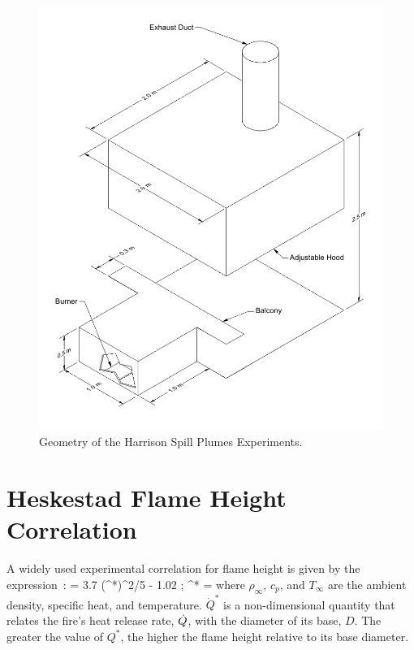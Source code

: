 \begin{figure}[p]
\includegraphics[width=\textwidth]{FIGURES/Harrison_Spill_Plumes/Harrison_Spill_Plumes}
\caption{Geometry of the Harrison Spill Plumes Experiments.}
\label{Harrison_Drawing}
\end{figure}




\section{Heskestad Flame Height Correlation}
\label{Heskestad_Flame_Height_Description}

A widely used experimental correlation for flame height is given by the expression~\cite{Heskestad:FSJ1983,SFPE:Heskestad}:
\be
    = 3.7 \; (^*)^{2/5} - 1.02  \quad ; \quad {}^* = 
\ee
where $\rho_\infty$, $c_p$, and $T_\infty$ are the ambient density, specific heat, and temperature. $\dot{Q}^*$ is a non-dimensional quantity that relates the fire's heat release rate, $\dot{Q}$, with the diameter of its base, $D$. The greater the value of $Q^*$, the higher the flame height relative to its base diameter.

